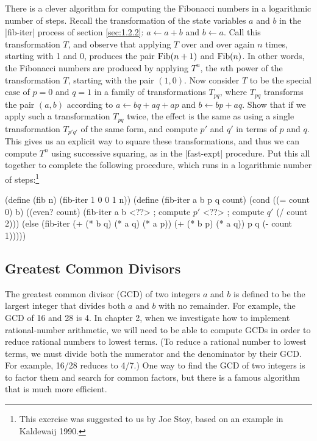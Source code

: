 \begin{Exercise}
\label{exc:1.19}
There is a clever algorithm for computing the Fibonacci numbers in a
logarithmic number of steps.  Recall the transformation of the state
variables $a$ and $b$ in the \scheme|fib-iter| process of section
\ref{sec:1.2.2}: $a \leftarrow a + b$ and $b \leftarrow a$.  Call this
transformation $T$, and observe that applying $T$ over and over again
$n$ times, starting with 1 and 0, produces the pair ${\rm Fib}(n + 1)$
and ${\rm Fib}(n)$.  In other words, the Fibonacci numbers are produced by
applying $T^n$, the $n$th power of the transformation $T$, starting
with the pair $(1,0)$.  Now consider $T$ to be the special case of $p
= 0$ and $q = 1$ in a family of transformations $T_{pq}$, where
$T_{pq}$ transforms the pair $(a,b)$ according to $a \leftarrow bq +
aq + ap$ and $b \leftarrow bp + aq$.  Show that if we apply such a
transformation $T_{pq}$ twice, the effect is the same as using a
single transformation $T_{p'q'}$ of the same form, and compute $p'$
and $q'$ in terms of $p$ and $q$.  This gives us an explicit way to
square these transformations, and thus we can compute $T^n$ using
successive squaring, as in the \scheme|fast-expt| procedure.  Put this
all together to complete the following procedure, which runs in a
logarithmic number of steps:\footnote{This exercise was
suggested to us by Joe Stoy, based on an example in Kaldewaij 1990.}

\begin{schemedisplay}
(define (fib n)
  (fib-iter 1 0 0 1 n))
(define (fib-iter a b p q count)
  (cond ((= count 0) b)
        ((even? count)
         (fib-iter a
                   b
                   <??>      ; compute $p'$
                   <??>      ; compute $q'$
                   (/ count 2)))
        (else (fib-iter (+ (* b q) (* a q) (* a p))
                        (+ (* b p) (* a q))
                        p
                        q
                        (- count 1)))))
\end{schemedisplay}
\end{Exercise}

\subsection{Greatest Common Divisors}
\label{sec:1.2.5}

The greatest common divisor (GCD) of two integers $a$ and $b$ is
defined to be the largest integer that divides both $a$ and
$b$ with no remainder.  For example, the GCD of 16 and 28 is 4.  In chapter 2,
when we investigate how to implement rational-number arithmetic, we
will need to be able to compute GCDs in order to reduce
rational numbers to lowest terms.  (To reduce a rational number to
lowest terms, we must divide both the numerator and the denominator by their
GCD.  For example, 16/28 reduces to 4/7.)  One way to find the
GCD of two integers is to factor them and search for common
factors, but there is a famous algorithm that is much more efficient.

